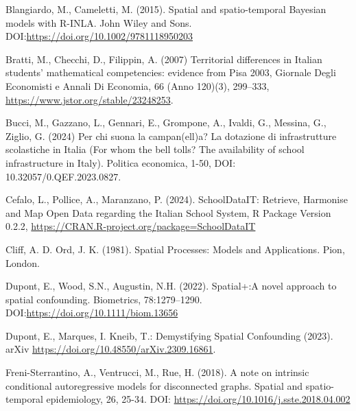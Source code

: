 \documentclass{article}
\begin{document}
\begin{thebibliography}{99}
Blangiardo, M., Cameletti, M. (2015). Spatial and spatio-temporal Bayesian models with R-INLA. John Wiley and Sons. DOI:\url{https://doi.org/10.1002/9781118950203}

Bratti, M.,  Checchi, D., Filippin, A. (2007) Territorial differences in Italian students' mathematical competencies: evidence from Pisa 2003, Giornale Degli Economisti e Annali Di Economia, 66 (Anno 120)(3), 299–333, \url{https://www.jstor.org/stable/23248253}.

Bucci, M., Gazzano, L., Gennari, E., Grompone, A., Ivaldi, G., Messina, G.,  Ziglio, G. (2024) Per chi suona la campan(ell)a? La dotazione di infrastrutture scolastiche in Italia (For whom the bell tolls? The availability of school infrastructure in Italy). Politica economica, 1-50, DOI: 10.32057/0.QEF.2023.0827.

Cefalo, L., Pollice, A., Maranzano, P. (2024). SchoolDataIT: Retrieve, Harmonise and Map Open Data regarding the Italian School System, R Package Version 0.2.2, \url{https://CRAN.R-project.org/package=SchoolDataIT}



Cliff, A. D.  Ord, J. K. (1981). Spatial Processes: Models and Applications. Pion, London. 

Dupont, E., Wood, S.N., Augustin, N.H. (2022). Spatial+:A novel approach to spatial confounding. Biometrics, 78:1279–1290. DOI:\url{https://doi.org/10.1111/biom.13656}

Dupont, E., Marques, I. Kneib, T.: Demystifying Spatial Confounding (2023). arXiv \url{https://doi.org/10.48550/arXiv.2309.16861}.

Freni-Sterrantino, A., Ventrucci, M., Rue, H. (2018). A note on intrinsic conditional autoregressive models for disconnected graphs. Spatial and spatio-temporal epidemiology, 26, 25-34. DOI: \url{https://doi.org/10.1016/j.sste.2018.04.002}


\end{thebibliography}
\end{document}
